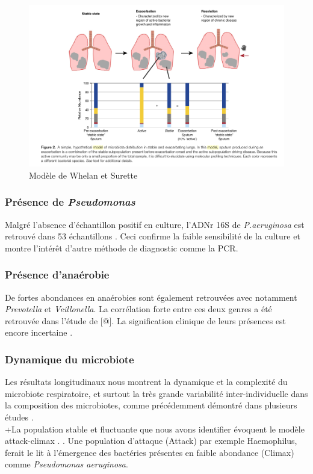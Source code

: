 \documentclass[12pt,a4paper]{article}
\begin{document}
\begin{figure}[h]
\begin{center}
\includegraphics[scale=0.60]{img/lung_region.png}\hfill
\end{center}
\caption{Modèle de Whelan et Surette \cite{Whelan2015}}
\label{lungregion}
\end{figure}

\subsubsection{Présence de \textit{Pseudomonas}}
Malgré l'absence d'échantillon positif en culture, l'ADNr 16S de \textit{P.aeruginosa} est retrouvé dans 53 échantillons . Ceci confirme la faible sensibilité de la culture et montre l’intérêt d’autre méthode de diagnostic comme la PCR\cite{LeGall}.

\subsubsection{Présence d'anaérobie}
De fortes abondances en anaérobies  sont également retrouvées avec notamment \textit{Prevotella} et \textit{Veillonella}. La corrélation forte  entre ces deux genres a été retrouvée dans l’étude de [@]. La signification clinique de leurs présences est encore incertaine \cite{Tunney2008}.

\subsubsection{Dynamique du microbiote}
Les résultats longitudinaux nous montrent la dynamique et la complexité du microbiote respiratoire, et surtout la très grande variabilité inter-individuelle dans la composition des microbiotes, comme précédemment démontré dans  plusieurs études \cite{Coburn2015}.  \\
 +La population stable et fluctuante que nous avons identifier évoquent le modèle attack-climax \cite{Conrad2013}. . Une population d'attaque (Attack) par exemple Haemophilus, ferait le lit à l'émergence des bactéries présentes en faible abondance (Climax) comme \textit{Pseudomonas aeruginosa}.
\end{document}
